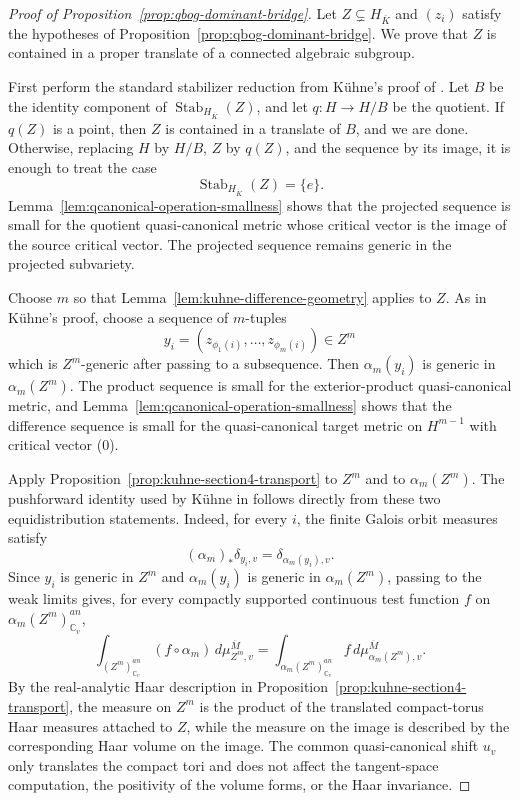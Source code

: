 \documentclass[10pt,a4paper]{amsart}
\theoremstyle{plain}
\theoremstyle{plain}
\numberwithin{equation}{section}
\providecommand{\bM}{\overline{M}}
\begin{document}
\begin{proof}[Proof of Proposition~\ref{prop:qbog-dominant-bridge}]
	Let \(Z\subsetneq H_{\overline K}\) and \((z_i)\) satisfy the hypotheses of
	Proposition~\ref{prop:qbog-dominant-bridge}.  We prove that \(Z\) is contained in a
	proper translate of a connected algebraic subgroup.
	
	First perform the standard stabilizer reduction from K\"uhne's proof of
	\cite[Proposition~6.1]{Ku1}.  Let \(B\) be the identity component of
	\(\operatorname{Stab}_{H_{\overline K}}(Z)\), and let
	\(q:H\to H/B\) be the quotient.  If \(q(Z)\) is a point, then \(Z\) is contained
	in a translate of \(B\), and we are done.  Otherwise, replacing \(H\) by
	\(H/B\), \(Z\) by \(q(Z)\), and the sequence by its image, it is enough to
	treat the case
	\[
	\operatorname{Stab}_{H_{\overline K}}(Z)=\{e\}.
	\]
	Lemma~\ref{lem:qcanonical-operation-smallness} shows that the projected
	sequence is small for the quotient quasi-canonical metric whose critical
	vector is the image of the source critical vector.  The projected sequence
	remains generic in the projected subvariety.
	
	Choose \(m\) so that Lemma~\ref{lem:kuhne-difference-geometry} applies to
	\(Z\).  As in K\"uhne's proof, choose a sequence of \(m\)-tuples
	\[
	y_i=(z_{\phi_1(i)},\ldots,z_{\phi_m(i)})\in Z^m
	\]
	which is \(Z^m\)-generic after passing to a subsequence.  Then
	\(\alpha_m(y_i)\) is generic in \(\alpha_m(Z^m)\).  The product sequence is
	small for the exterior-product quasi-canonical metric, and
	Lemma~\ref{lem:qcanonical-operation-smallness} shows that the difference
	sequence is small for the quasi-canonical target metric on \(H^{m-1}\) with
	critical vector (0).
	
	Apply Proposition~\ref{prop:kuhne-section4-transport} to \(Z^m\) and to
	\(\alpha_m(Z^m)\).  The pushforward identity used by K\"uhne in
	\cite[equation~(6.2)]{Ku1} follows directly from these two
	equidistribution statements.  Indeed, for every \(i\), the finite Galois orbit
	measures satisfy
	\[
	(\alpha_m)_*\delta_{y_i,v}=\delta_{\alpha_m(y_i),v}.
	\]
	Since \(y_i\) is generic in \(Z^m\) and \(\alpha_m(y_i)\) is generic in
	\(\alpha_m(Z^m)\), passing to the weak limits gives, for every compactly
	supported continuous test function \(f\) on
	\(\alpha_m(Z^m)^{an}_{\mathbb C_v}\),
	\[
	\int_{(Z^m)^{an}_{\mathbb C_v}}(f\circ\alpha_m)\,d\mu_{Z^m,v}^{\bM}
	=
	\int_{\alpha_m(Z^m)^{an}_{\mathbb C_v}} f\,d\mu_{\alpha_m(Z^m),v}^{\bM}.
	\]
	By the real-analytic Haar description in
	Proposition~\ref{prop:kuhne-section4-transport}, the measure on \(Z^m\) is the
	product of the translated compact-torus Haar measures attached to \(Z\), while
	the measure on the image is described by the corresponding Haar volume on the
	image.  The common quasi-canonical shift \(u_v\) only translates the compact
	tori and does not affect the tangent-space computation, the positivity of the
	volume forms, or the Haar invariance.
	

\end{proof}
\end{document}

